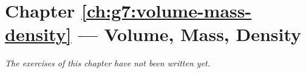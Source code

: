 \section*{Chapter \ref{ch:g7:volume-mass-density} --- Volume, Mass, Density}


\emph{The exercises of this chapter have not been written yet.}
